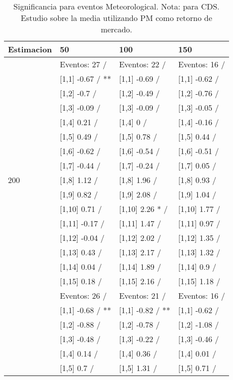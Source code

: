 \begin{table}

\caption{Significancia para eventos Meteorological. Nota: para CDS. Estudio sobre la media utilizando PM como retorno de mercado.}
\centering
\begin{tabular}[t]{llll}
\toprule
Estimacion & 50 & 100 & 150\\
\midrule
 & Eventos:  27 / & Eventos:  22 / & Eventos:  16 /\\
 & {}[1,1] -0.67  / ** & {}[1,1] -0.69  / & {}[1,1] -0.62  /\\
 & {}[1,2] -0.7  / & {}[1,2] -0.49  / & {}[1,2] -0.76  /\\
 & {}[1,3] -0.09  / & {}[1,3] -0.09  / & {}[1,3] -0.05  /\\
 & {}[1,4] 0.21  / & {}[1,4] 0  / & {}[1,4] -0.16  /\\
\addlinespace
 & {}[1,5] 0.49  / & {}[1,5] 0.78  / & {}[1,5] 0.44  /\\
 & {}[1,6] -0.62  / & {}[1,6] -0.54  / & {}[1,6] -0.51  /\\
 & {}[1,7] -0.44  / & {}[1,7] -0.24  / & {}[1,7] 0.05  /\\
200 & {}[1,8] 1.12  / & {}[1,8] 1.96  / & {}[1,8] 0.93  /\\
 & {}[1,9] 0.82  / & {}[1,9] 2.08  / & {}[1,9] 1.04  /\\
\addlinespace
 & {}[1,10] 0.71  / & {}[1,10] 2.26 * / & {}[1,10] 1.77  /\\
 & {}[1,11] -0.17  / & {}[1,11] 1.47  / & {}[1,11] 0.97  /\\
 & {}[1,12] -0.04  / & {}[1,12] 2.02  / & {}[1,12] 1.35  /\\
 & {}[1,13] 0.43  / & {}[1,13] 2.17  / & {}[1,13] 1.32  /\\
 & {}[1,14] 0.04  / & {}[1,14] 1.89  / & {}[1,14] 0.9  /\\
\addlinespace
 & {}[1,15] 0.18  / & {}[1,15] 2.16  / & {}[1,15] 1.18  /\\
 & Eventos:  26 / & Eventos:  21 / & Eventos:  16 /\\
 & {}[1,1] -0.68  / ** & {}[1,1] -0.82  / ** & {}[1,1] -0.62  /\\
 & {}[1,2] -0.88  / & {}[1,2] -0.78  / & {}[1,2] -1.08  /\\
 & {}[1,3] -0.48  / & {}[1,3] -0.22  / & {}[1,3] -0.46  /\\
\addlinespace
 & {}[1,4] 0.14  / & {}[1,4] 0.36  / & {}[1,4] 0.01  /\\
 & {}[1,5] 0.7  / & {}[1,5] 1.31  / & {}[1,5] 0.71  /\\

\end{tabular}
\end{table}
